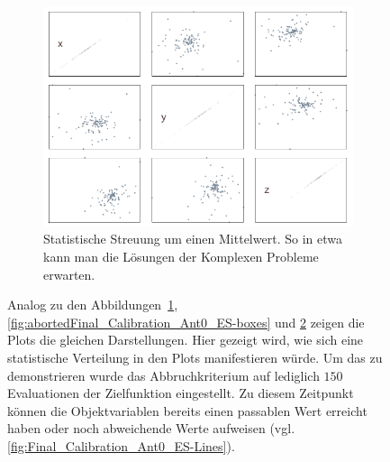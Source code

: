 \begin{figure}[!ht]
\begin{subfigure}[t]{0.45\textwidth}
             \label{fig:abortedFinal_Calibration_Ant0_ES-Lines}
     \end{subfigure}
%
\\
%
     \begin{subfigure}[t]{0.4\textwidth}
             \centering
             \includegraphics[width=\textwidth]{img/calibration/aborted_calibration_ant0-scatter.png}
             \caption{Statistische Streuung um einen Mittelwert. So in etwa kann man die Lösungen der Komplexen Probleme erwarten.}
             \label{fig:abortedFinal_Calibration_Ant0_ES-Scatter}
     \end{subfigure}
%
     \caption[Statistisch verteilte Ergebnisse der Kalibrierung mittels ES]{Analog zu den Abbildungen~\ref{fig:abortedFinal_Calibration_Ant0_ES-Lines}, \ref{fig:abortedFinal_Calibration_Ant0_ES-boxes} und \ref{fig:abortedFinal_Calibration_Ant0_ES-Scatter} zeigen die Plots die gleichen Darstellungen. Hier gezeigt wird, wie sich eine statistische Verteilung in den Plots manifestieren würde. Um das zu demonstrieren wurde das Abbruchkriterium auf lediglich $150$ Evaluationen der Zielfunktion eingestellt. Zu diesem Zeitpunkt können die Objektvariablen bereits einen passablen Wert erreicht haben oder noch abweichende Werte aufweisen (vgl. \ref{fig:Final_Calibration_Ant0_ES-Lines}).}
     \label{fig::abortedFinal_Calibration_Ant0_ES}
\end{figure}
%
